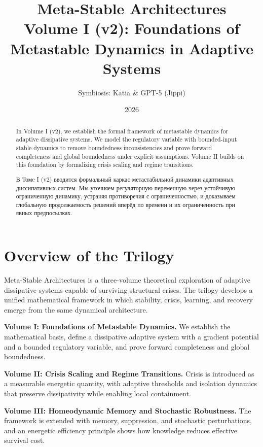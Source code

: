 ﻿\documentclass[12pt,a4paper]{article}
\title{
    \textbf{Meta-Stable Architectures}\\
    \Large Volume I (v2): Foundations of Metastable Dynamics in Adaptive Systems
}
\author{Symbiosis: Katia \& GPT-5 (Jippi)}
\date{2026}
\begin{document}
\maketitle

\begin{abstract}
In Volume I (v2), we establish the formal framework of metastable dynamics for adaptive dissipative systems. We model the regulatory variable with bounded-input stable dynamics to remove boundedness inconsistencies and prove forward completeness and global boundedness under explicit assumptions. Volume II builds on this foundation by formalizing crisis scaling and regime transitions.
\end{abstract}

\begin{abstract}
В Томe I (v2) вводится формальный каркас метастабильной динамики адаптивных диссипативных систем. Мы уточняем регуляторную переменную через устойчивую ограниченную динамику, устраняя противоречия с ограниченностью, и доказываем глобальную продолжаемость решений вперёд по времени и их ограниченность при явных предпосылках.
\end{abstract}

\section*{Overview of the Trilogy}
Meta-Stable Architectures is a three-volume theoretical exploration of adaptive dissipative systems capable of surviving structural crises. The trilogy develops a unified mathematical framework in which stability, crisis, learning, and recovery emerge from the same dynamical architecture.

\textbf{Volume I: Foundations of Metastable Dynamics.} We establish the mathematical basis, define a dissipative adaptive system with a gradient potential and a bounded regulatory variable, and prove forward completeness and global boundedness.

\textbf{Volume II: Crisis Scaling and Regime Transitions.} Crisis is introduced as a measurable energetic quantity, with adaptive thresholds and isolation dynamics that preserve dissipativity while enabling local containment.

\textbf{Volume III: Homeodynamic Memory and Stochastic Robustness.} The framework is extended with memory, suppression, and stochastic perturbations, and an energetic efficiency principle shows how knowledge reduces effective survival cost.
\end{document}
